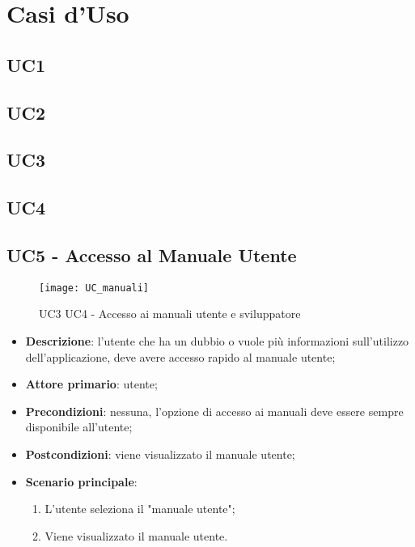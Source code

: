 \chapter{Casi d'Uso}


\section{UC1}

\section{UC2}

\section{UC3}

\section{UC4}

\section{UC5 - Accesso al Manuale Utente}
\begin{figure}[h]
  \centering
  \texttt{[image: UC\_manuali]}
  \caption{UC3 UC4 - Accesso ai manuali utente e sviluppatore}
\end{figure}

\begin{itemize}
  \item \textbf{Descrizione}: l'utente che ha un dubbio o vuole più informazioni sull'utilizzo dell'applicazione, deve avere accesso rapido al manuale utente;
  \item \textbf{Attore primario}: utente;
  \item \textbf{Precondizioni}: nessuna, l'opzione di accesso ai manuali deve essere sempre disponibile all'utente;
  \item \textbf{Postcondizioni}: viene visualizzato il manuale utente;
  \item \textbf{Scenario principale}: 
  \begin{enumerate}
    \item L'utente seleziona il "manuale utente";
    \item Viene visualizzato il manuale utente.
  \end{enumerate}
\end{itemize}

